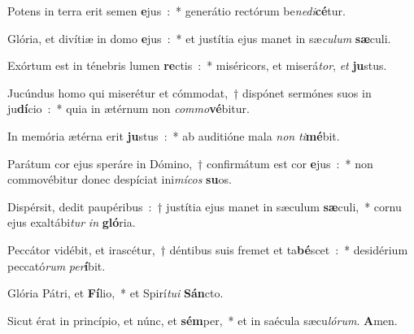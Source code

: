 ﻿\item Potens in terra erit semen \textbf{e}\-jus~:~* generátio rectórum be\emph{ne}\-\emph{di}\-\textbf{cé}\-tur.
\item Glória, et divítiæ in domo \textbf{e}\-jus~:~* et justítia ejus manet in sæ\emph{cu}\-\emph{lum} \textbf{sæ}\-culi.
\item Exórtum est in ténebris lumen \textbf{re}\-ctis~:~* miséricors, et miserá\emph{tor}, \emph{et} \textbf{ju}\-stus.
\item Jucúndus homo qui miserétur et cómmodat,~† dispónet sermónes suos in ju\textbf{dí}\-cio~:~* quia in ætérnum non \emph{com}\-\emph{mo}\-\textbf{vé}\-bitur.
\item In memória ætérna erit \textbf{ju}\-stus~:~* ab auditióne mala \emph{non} \emph{ti}\-\textbf{mé}\-bit.
\item Parátum cor ejus speráre in Dómino,~† confirmátum est cor \textbf{e}\-jus~:~* non commovébitur donec despíciat ini\emph{mí}\-\emph{cos} \textbf{su}\-os.
\item Dispérsit, dedit paupéribus~:~† justítia ejus manet in sæculum \textbf{sæ}\-culi,~* cornu ejus exaltábi\emph{tur} \emph{in} \textbf{gló}\-ria.
\item Peccátor vidébit, et irascétur,~† déntibus suis fremet et ta\textbf{bé}\-scet~:~* desidérium peccató\emph{rum} \emph{per}\-\textbf{í}\-bit.
\item Glória Pátri, et \textbf{Fí}\-lio,~* et Spirí\emph{tu}\-\emph{i} \textbf{Sán}\-cto.
\item Sicut érat in princípio, et núnc, et \textbf{sém}\-per,~* et in saécula sæcu\emph{ló}\-\emph{rum}. \textbf{A}\-men.